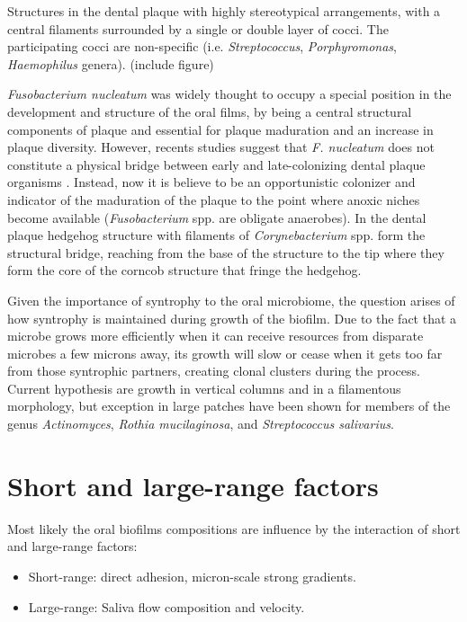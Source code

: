 \begin{definition}[Corncobs]
    Structures in the dental plaque with highly stereotypical arrangements, with a central filaments surrounded by a single 
    or double layer of cocci. The participating cocci are non-specific (i.e. \textit{Streptococcus}, \textit{Porphyromonas},
    \textit{Haemophilus} genera).
    (include figure)
\end{definition}

\textit{Fusobacterium nucleatum} was widely thought to occupy a special position in the development and structure of the 
oral films, by being a central structural components of plaque and essential for plaque maduration and an increase in plaque 
diversity. However, recents studies suggest that \textit{F. nucleatum} does not constitute a physical bridge between early 
and late-colonizing dental plaque organisms \cite{Welch2020}. Instead, now it is believe to be an opportunistic colonizer 
and indicator of the maduration of the plaque to the point where anoxic niches become available (\textit{Fusobacterium} spp. 
are obligate anaerobes). In the dental plaque hedgehog structure with filaments of \textit{Corynebacterium} spp. form the structural bridge, reaching 
from the base of the structure to the tip where they form the core of the corncob structure that fringe the hedgehog.

Given the importance of syntrophy to the oral microbiome, the question arises of how syntrophy is maintained during growth 
of the biofilm. Due to the fact that a microbe grows more efficiently when it can receive resources from disparate microbes 
a few microns away, its growth will slow or cease when it gets too far from those syntrophic partners, creating clonal clusters  
during the process. Current hypothesis are growth in vertical columns and in a filamentous morphology, but exception in 
large patches have been shown for members of the genus \textit{Actinomyces}, \textit{Rothia mucilaginosa}, 
and \textit{Streptococcus salivarius}.

\section{Short and large-range factors}
Most likely the oral biofilms compositions are influence by the interaction of short and large-range factors:
\begin{itemize}
    \item Short-range: direct adhesion, micron-scale strong gradients.
    \item Large-range: Saliva flow composition and velocity.
\end{itemize}

